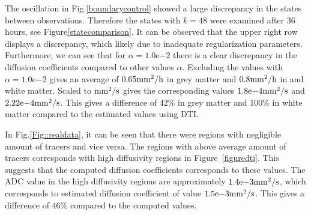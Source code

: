 \documentclass[11pt,a4paper]{article}
\newcommand{\fixme}[1]{\textcolor{orange}{#1}}
\begin{document}
The oscillation in Fig.\ref{boundarycontrol} showed a large discrepancy in the states between observations. Therefore the states with $k=48$ were examined after 36 hours, see Figure\ref{statecomparison}. It can be observed that the upper right row displays a discrepancy, which likely due to inadequate regularization parameters. Furthermore, we can see that for $\alpha=1.0\mathrm{e}{-2}$ there is a clear discrepancy in the diffusion coefficients compared to other values $\alpha$. Excluding the values with $\alpha=1.0\mathrm{e}{-2}$ gives an average of $ 0.65 \mathrm{mm\sp{2}/h}$ in grey matter and $ 0.8 \mathrm{mm\sp{2}/h}$ in and white matter. Scaled to $\mathrm{mm\sp{2}/s}$ gives the corresponding values $1.8\mathrm{e}{-4}\mathrm{mm\sp{2}/s}$ and $2.22\mathrm{e}{-4} \mathrm{mm\sp{2}/s}$. This gives a difference of 42\% in grey matter and $ 100 \%$ in white matter compared to the estimated values using DTI.


In Fig.\ref{Fig::realdata}, it can be seen that there were regions with negligible amount of tracers and vice versa. The regions with above average amount of tracers corresponds with high diffusivity regions in Figure~\ref{figuredti}. This suggests that the computed diffusion coefficients corresponds to these values. The ADC value in the high diffusivity regions are approximately  $1.4\mathrm{e}{-3} \mathrm{mm\sp{2}/s}$, which corresponds to estimated diffusion coefficient of value $1.5\mathrm{e}{-3} \mathrm{mm\sp{2}/s}$. This gives a difference of $ 46 \%$ compared to the computed values.


















\end{document}
